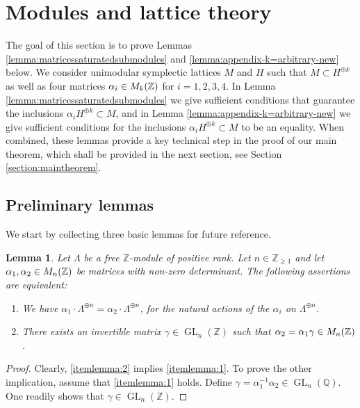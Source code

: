 \documentclass[a4paper,11pt,reqno]{amsart}
\numberwithin{equation}{section}
\theoremstyle{plain}
\newtheorem{lemma}[theorem]{Lemma}
\theoremstyle{definition}
\newcommand{\Z}{\mathbb Z}
\newcommand{\Q}{\mathbb Q}
\let\rm\relax
\newcommand{\rm}[1]{{\mathrm{#1}}}
\newcommand{\GL}{\operatorname{GL}}
\begin{document}
\section{Modules and lattice theory} \label{section:linear-algebra}

The goal of this section is to prove Lemmas \ref{lemma:matricessaturatedsubmodules} and \ref{lemma:appendix-k=arbitrary-new} below. 
We consider unimodular symplectic lattices
$M$ and $H$ such that $M \subset H^{\oplus k}$ as well as four matrices $\alpha_i \in \rm{M}_k(\Z)$  for $i=1,2,3,4$.
In Lemma \ref{lemma:matricessaturatedsubmodules} we give sufficient conditions that guarantee the inclusions $\alpha_i H^{\oplus k} \subset M$, and in Lemma \ref{lemma:appendix-k=arbitrary-new} we give sufficient conditions for the inclusions $\alpha_i H^{\oplus k} \subset M$ to be an equality. When combined, these lemmas provide a key technical step in the proof of our main theorem, which shall be provided in the next section, see Section \ref{section:maintheorem}. 

\subsection{Preliminary lemmas} 

We start by collecting three basic lemmas for future reference. 

\begin{lemma} \label{lemmma:images-freemodules:linear-algebra}
    Let $\Lambda$ be a free $\Z$-module of positive rank. Let $n \in \Z_{\geq 1}$ and let $\alpha_1, \alpha_2 \in \rm{M}_n(\Z)$ be matrices with non-zero determinant. The following assertions are equivalent:
    \begin{enumerate}
        \item \label{itemlemma:1} We have $\alpha_1 \cdot \Lambda^{\oplus n} = \alpha_2 \cdot \Lambda^{\oplus n}$, for the natural actions of the $\alpha_i$ on $\Lambda^{\oplus n}$. 
        \item \label{itemlemma:2} There exists an invertible matrix $\gamma \in \GL_n(\Z)$ such that $\alpha_2 = \alpha_1 \gamma \in \rm{M}_n(\Z)$. 
    \end{enumerate} 
\end{lemma}
\begin{proof}
Clearly, \eqref{itemlemma:2} implies \eqref{itemlemma:1}. To prove the other implication, assume that \eqref{itemlemma:1} holds. 
Define $\gamma = \alpha_1^{-1}\alpha_2 \in \GL_{n}(\Q)$. One readily shows that $\gamma \in \GL_n(\Z)$. 
    \end{proof}
\end{document}
